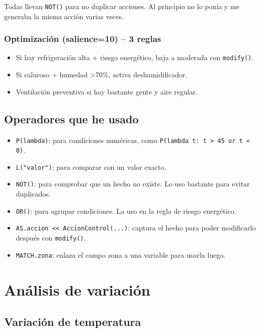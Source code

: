 \documentclass[12pt,a4paper]{article}
\begin{document}
Todas llevan \texttt{NOT()} para no duplicar acciones. Al principio no lo pon\'ia y me generaba la misma acci\'on varias veces.

\subsubsection*{Optimizaci\'on (salience=10) -- 3 reglas}
\begin{itemize}
    \item Si hay refrigeraci\'on alta + riesgo energ\'etico, baja a moderada con \texttt{modify()}.
    \item Si caluroso + humedad >70\%, activa deshumidificador.
    \item Ventilaci\'on preventiva si hay bastante gente y aire regular.
\end{itemize}

\subsection{Operadores que he usado}

\begin{itemize}
    \item \texttt{P(lambda)}: para condiciones num\'ericas, como \texttt{P(lambda t: t > 45 or t < 0)}.
    \item \texttt{L("valor")}: para comparar con un valor exacto.
    \item \texttt{NOT()}: para comprobar que un hecho no existe. Lo uso bastante para evitar duplicados.
    \item \texttt{OR()}: para agrupar condiciones. La uso en la regla de riesgo energ\'etico.
    \item \texttt{AS.accion << AccionControl(...)}: captura el hecho para poder modificarlo despu\'es con \texttt{modify()}.
    \item \texttt{MATCH.zona}: enlaza el campo zona a una variable para usarla luego.
\end{itemize}

\newpage
\section{An\'alisis de variaci\'on}

\subsection{Variaci\'on de temperatura}
\end{document}
